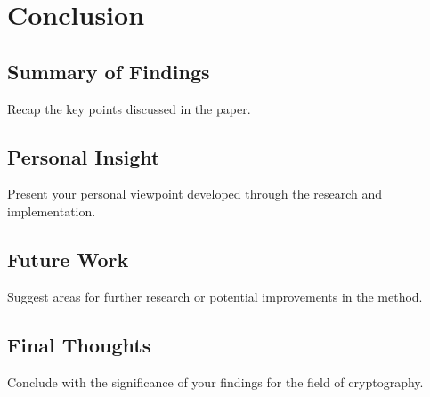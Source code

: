 \section{Conclusion}

\subsection{Summary of Findings}

Recap the key points discussed in the paper.

\subsection{Personal Insight}

Present your personal viewpoint developed through the research and implementation.


\subsection{Future Work}

Suggest areas for further research or potential improvements in the method.

\subsection{Final Thoughts}

Conclude with the significance of your findings for the field of cryptography.
